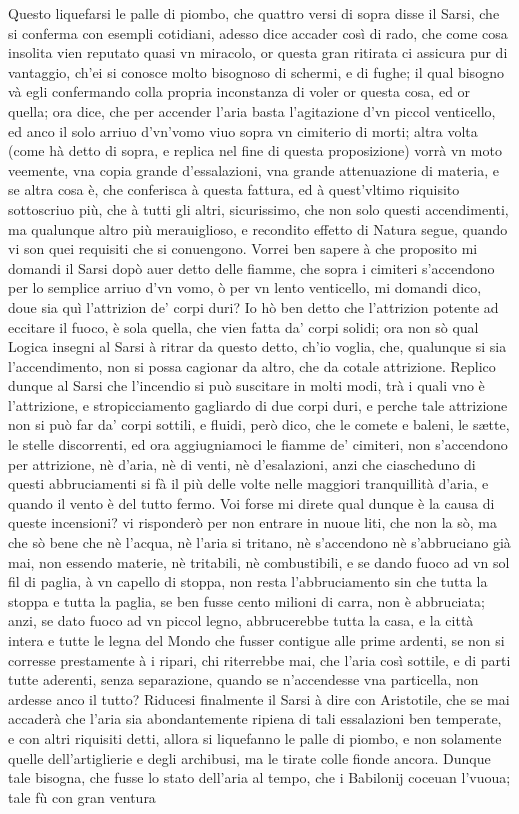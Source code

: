 \documentclass[11pt,twoside,openany]{book}
\begin{document}
Questo liquefarsi le palle di piombo, che quattro versi di sopra disse il Sarsi, che si conferma con esempli cotidiani, adesso dice accader così di rado, che come cosa insolita vien reputato quasi vn miracolo, or questa gran ritirata ci assicura pur di vantaggio, ch'ei si conosce molto bisognoso di schermi, e di fughe; il qual bisogno và egli confermando colla propria inconstanza di voler or questa cosa, ed or quella; ora dice, che per accender l'aria basta l'agitazione d'vn piccol venticello, ed anco il solo arriuo d'vn'vomo viuo sopra vn cimiterio di morti; altra volta (come hà detto di sopra, e replica nel fine di questa proposizione) vorrà vn moto veemente, vna copia grande d'essalazioni, vna grande attenuazione di materia, e se altra cosa è, che conferisca à questa fattura, ed à quest'vltimo riquisito sottoscriuo più, che à tutti gli altri, sicurissimo, che non solo questi accendimenti, ma qualunque altro più merauiglioso, e recondito effetto di Natura segue, quando vi son quei requisiti che si conuengono. Vorrei ben sapere à che proposito mi domandi il Sarsi dopò auer detto delle fiamme, che sopra i cimiteri s'accendono per lo semplice arriuo d'vn vomo, ò per vn lento venticello, mi domandi dico, doue sia quì l'attrizion de' corpi duri? Io hò ben detto che l'attrizion potente ad eccitare il fuoco, è sola quella, che vien fatta da' corpi solidi; ora non sò qual Logica insegni al Sarsi à ritrar da questo detto, ch'io voglia, che, qualunque si sia l'accendimento, non si possa cagionar da altro, che da cotale attrizione. Replico dunque al Sarsi che l'incendio si può suscitare in molti modi, trà i quali vno è l'attrizione, e stropicciamento gagliardo di due corpi duri, e perche tale attrizione non si può far da' corpi sottili, e fluidi, però dico, che le comete e baleni, le sætte, le stelle discorrenti, ed ora aggiugniamoci le fiamme de' cimiteri, non s'accendono per attrizione, nè d'aria, nè di venti, nè d'esalazioni, anzi che ciascheduno di questi abbruciamenti si fà il più delle volte nelle maggiori tranquillità d'aria, e quando il vento è del tutto fermo. Voi forse mi direte qual dunque è la causa di queste incensioni? vi risponderò per non entrare in nuoue liti, che non la sò, ma che sò bene che nè l'acqua, nè l'aria si tritano, nè s'accendono nè s'abbruciano già mai, non essendo materie, nè tritabili, nè combustibili, e se dando fuoco ad vn sol fil di paglia, à vn capello di stoppa, non resta l'abbruciamento sin che tutta la stoppa e tutta la paglia, se ben fusse cento milioni di carra, non è abbruciata; anzi, se dato fuoco ad vn piccol legno, abbrucerebbe tutta la casa, e la città intera e tutte le legna del Mondo che fusser contigue alle prime ardenti, se non si corresse prestamente à i ripari, chi riterrebbe mai, che l'aria così sottile, e di parti tutte aderenti, senza separazione, quando se n'accendesse vna particella, non ardesse anco il tutto? Riducesi finalmente il Sarsi à dire con Aristotile, che se mai accaderà che l'aria sia abondantemente ripiena di tali essalazioni ben temperate, e con altri riquisiti detti, allora si liquefanno le palle di piombo, e non solamente quelle dell'artiglierie e degli archibusi, ma le tirate colle fionde ancora. Dunque tale bisogna, che fusse lo stato dell'aria al tempo, che i Babilonij coceuan l'vuoua; tale fù con gran ventura 
\end{document}
